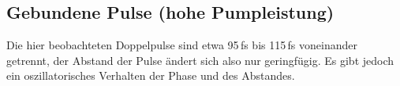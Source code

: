 \documentclass[bachelor,       %
               twoside,        %
               BCOR10mm,       %
               liststotoc,nomtotoc,bibtotoc, %
               english,ngerman, %
               final,          %
               ]{GAUBM}
\begin{document}
\clearpage
\subsection{Gebundene Pulse (hohe Pumpleistung)}
\label{sec:oscillatingSolitons}
Die hier beobachteten Doppelpulse sind etwa 95\,fs bis 115\,fs voneinander getrennt, der Abstand der Pulse ändert sich also nur geringfügig.
Es gibt jedoch ein oszillatorisches Verhalten der Phase und des Abstandes.
\begin{figure}[!htb]
   \centering
   \captionsetup[subfigure]{labelformat=empty}
   \captionsetup[subfloat]{farskip=-10pt,captionskip=0pt}
   \hfill
   

\end{figure}
\end{document}

